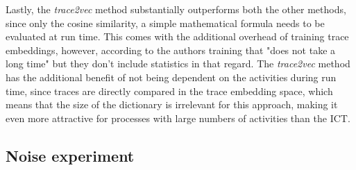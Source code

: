\documentclass[runningheads]{template/llncs}
\begin{document}
Lastly, the \emph{trace2vec} method substantially outperforms both the other methods, since only the cosine similarity, a simple mathematical formula needs to be evaluated at run time.
This comes with the additional overhead of training trace embeddings, however, according to the authors training that "does not take a long time" but they don't include statistics in that regard.
The \emph{trace2vec} method has the additional benefit of not being dependent on the activities during run time, since traces are directly compared in the trace embedding space, which means that the size of the dictionary is irrelevant for this approach, making it even more attractive for processes with large numbers of activities than the ICT.

\subsection{Noise experiment}
\end{document}

